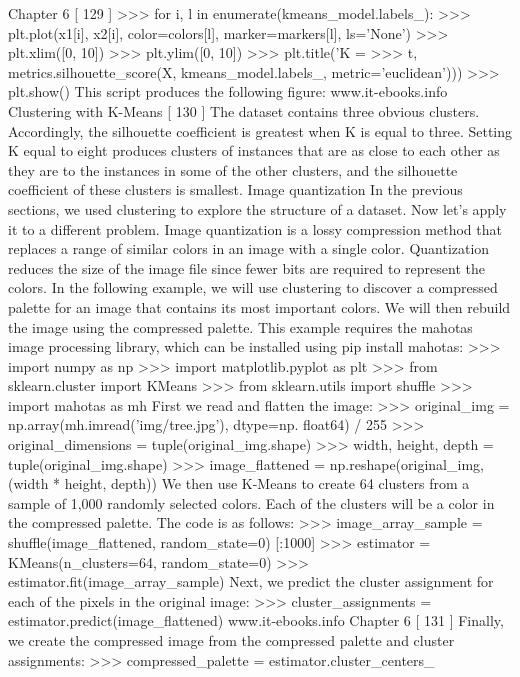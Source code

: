 Chapter 6
[ 129 ]
>>> for i, l in enumerate(kmeans_model.labels_):
>>> plt.plot(x1[i], x2[i], color=colors[l], marker=markers[l],
ls='None')
>>> plt.xlim([0, 10])
>>> plt.ylim([0, 10])
>>> plt.title('K = %
>>> t, metrics.silhouette_score(X, kmeans_model.labels_,
metric='euclidean')))
>>> plt.show()
This script produces the following figure:
www.it-ebooks.info
Clustering with K-Means
[ 130 ]
The dataset contains three obvious clusters. Accordingly, the silhouette coefficient
is greatest when K is equal to three. Setting K equal to eight produces clusters of
instances that are as close to each other as they are to the instances in some of the
other clusters, and the silhouette coefficient of these clusters is smallest.
Image quantization
In the previous sections, we used clustering to explore the structure of a dataset.
Now let's apply it to a different problem. Image quantization is a lossy compression
method that replaces a range of similar colors in an image with a single color.
Quantization reduces the size of the image file since fewer bits are required to
represent the colors. In the following example, we will use clustering to discover a
compressed palette for an image that contains its most important colors. We will then
rebuild the image using the compressed palette. This example requires the mahotas
image processing library, which can be installed using pip install mahotas:
>>> import numpy as np
>>> import matplotlib.pyplot as plt
>>> from sklearn.cluster import KMeans
>>> from sklearn.utils import shuffle
>>> import mahotas as mh
First we read and flatten the image:
>>> original_img = np.array(mh.imread('img/tree.jpg'), dtype=np.
float64) / 255
>>> original_dimensions = tuple(original_img.shape)
>>> width, height, depth = tuple(original_img.shape)
>>> image_flattened = np.reshape(original_img, (width * height, depth))
We then use K-Means to create 64 clusters from a sample of 1,000 randomly selected
colors. Each of the clusters will be a color in the compressed palette. The code is
as follows:
>>> image_array_sample = shuffle(image_flattened, random_state=0)
[:1000]
>>> estimator = KMeans(n_clusters=64, random_state=0)
>>> estimator.fit(image_array_sample)
Next, we predict the cluster assignment for each of the pixels in the original image:
>>> cluster_assignments = estimator.predict(image_flattened)
www.it-ebooks.info
Chapter 6
[ 131 ]
Finally, we create the compressed image from the compressed palette and
cluster assignments:
>>> compressed_palette = estimator.cluster_centers_
